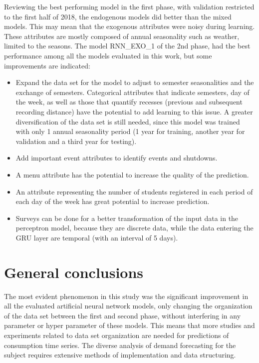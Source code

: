     Reviewing the best performing model in the first phase, with validation restricted to the first half of 2018, the endogenous models did better than the mixed models. This may mean that the exogenous attributes were noisy during learning. These attributes are mostly composed of annual seasonality such as weather, limited to the seasons. 
    The model RNN\_EXO\_1 of the 2nd phase,  had the best performance among all the models evaluated in this work, but some improvements are indicated:
        \begin{itemize}
            \item Expand the data set for the model to adjust to semester seasonalities and the exchange of semesters. Categorical attributes that indicate semesters, day of the week, as well as those that quantify recesses (previous and subsequent recording distance) have the potential to add learning to this issue. A greater diversification of the data set is still needed, since this model was trained with only 1 annual seasonality period (1 year for training, another year for validation and a third year for testing).
            \item Add important event attributes to identify events and shutdowns.
            \item A menu attribute has the potential to increase the quality of the prediction.
            \item An attribute representing the number of students registered in each period of each day of the week has great potential to increase prediction.
            \item Surveys can be done for a better transformation of the input data in the perceptron model, because they are discrete data, while the data entering the GRU layer are temporal (with an interval of 5 days).
        \end{itemize}
        
    \section{General conclusions}
        
        The most evident phenomenon in this study was the significant improvement in all the evaluated artificial neural network models, only changing the organization of the data set between the first and second phase, without interfering in any parameter or hyper parameter of these models. This means that more studies and experiments related to data set organization are needed for predictions of consumption time series. The diverse analysis of demand forecasting for the subject requires extensive methods of implementation and data structuring.
        
